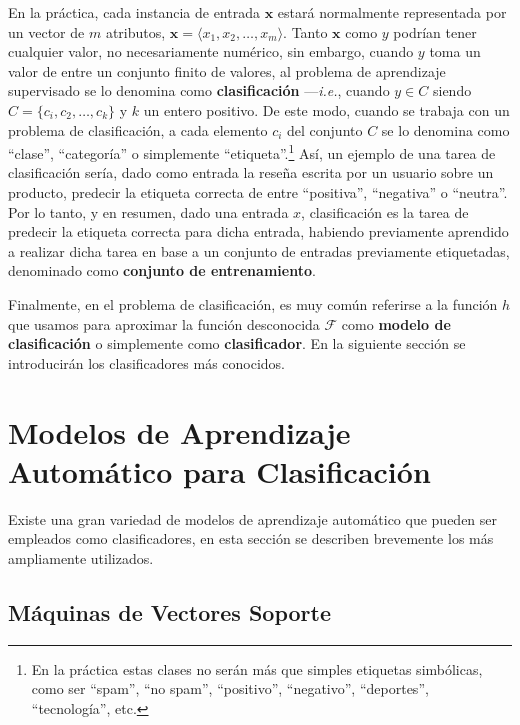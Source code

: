 En la práctica, cada instancia de entrada $\pmb{x}$ estará normalmente representada por un vector de $m$ atributos, $\pmb{x}=\langle x_1,x_2,\dots,x_m\rangle$.
Tanto $\pmb{x}$ como $y$ podrían tener cualquier valor, no necesariamente numérico, sin embargo, cuando $y$ toma un valor de entre un conjunto finito de valores, al problema de aprendizaje supervisado se lo denomina como \textbf{clasificación} ---\emph{i.e.}, cuando $y\in C$ siendo $C=\{c_i,c_2,\dots,c_k\}$ y $k$ un entero positivo.
De este modo, cuando se trabaja con un problema de clasificación, a cada elemento $c_i$ del conjunto $C$ se lo denomina como ``clase'', ``categoría'' o simplemente ``etiqueta''.\footnote{En la práctica estas clases no serán más que simples etiquetas simbólicas, como ser ``spam'', ``no spam'', ``positivo'', ``negativo'', ``deportes'', ``tecnología'', etc.}
Así, un ejemplo de una tarea de clasificación sería, dado como entrada la reseña escrita por un usuario sobre un producto, predecir la etiqueta correcta de entre ``positiva'', ``negativa'' o ``neutra''.
Por lo tanto, y en resumen, dado una entrada $x$, clasificación es la tarea de predecir la etiqueta correcta para dicha entrada, habiendo previamente aprendido a realizar dicha tarea en base a un conjunto de entradas previamente etiquetadas, denominado como \textbf{conjunto de entrenamiento}.

Finalmente, en el problema de clasificación, es muy común referirse a la función $h$ que usamos para aproximar la función desconocida $\mathcal{F}$ como \textbf{modelo de clasificación} o simplemente como \textbf{clasificador}. En la siguiente sección se introducirán los clasificadores más conocidos.

\section{Modelos de Aprendizaje Automático para Clasificación}

Existe una gran variedad de modelos de aprendizaje automático que pueden ser empleados como clasificadores, en esta sección se describen brevemente los más ampliamente utilizados.

\subsection{Máquinas de Vectores Soporte}

